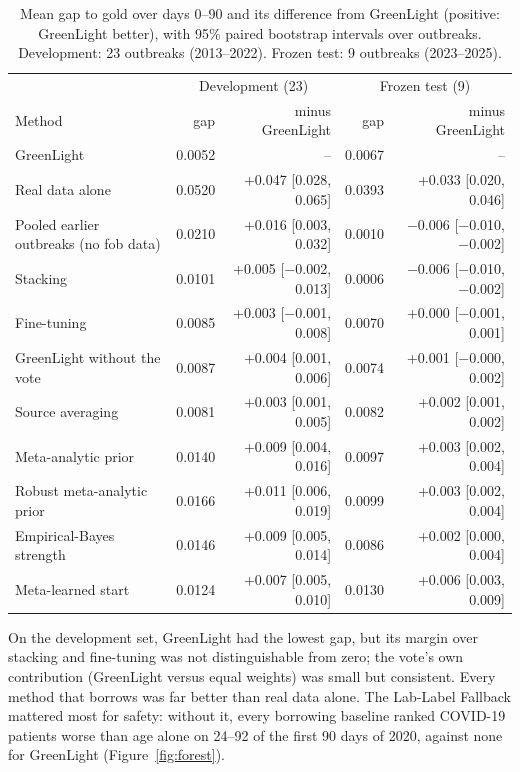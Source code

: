 \documentclass[10pt]{article}
\begin{document}
\begin{table}[t]
\centering\small
\caption{Mean gap to gold over days 0--90 and its difference from GreenLight (positive: GreenLight better), with 95\% paired
bootstrap intervals over outbreaks. Development: 23 outbreaks (2013--2022). Frozen test: 9 outbreaks (2023--2025).}
\label{tab:baselines}
\begin{tabular}{lrrrr}
\toprule
& \multicolumn{2}{c}{Development (23)} & \multicolumn{2}{c}{Frozen test (9)} \\
Method & gap & minus GreenLight & gap & minus GreenLight \\
\midrule
GreenLight & 0.0052 & -- & 0.0067 & -- \\
Real data alone & 0.0520 & +0.047 [0.028, 0.065] & 0.0393 & +0.033 [0.020, 0.046] \\
Pooled earlier outbreaks (no fob data) & 0.0210 & +0.016 [0.003, 0.032] & 0.0010 & $-$0.006 [$-$0.010, $-$0.002] \\
Stacking & 0.0101 & +0.005 [$-$0.002, 0.013] & 0.0006 & $-$0.006 [$-$0.010, $-$0.002] \\
Fine-tuning & 0.0085 & +0.003 [$-$0.001, 0.008] & 0.0070 & +0.000 [$-$0.001, 0.001] \\
GreenLight without the vote & 0.0087 & +0.004 [0.001, 0.006] & 0.0074 & +0.001 [$-$0.000, 0.002] \\
Source averaging & 0.0081 & +0.003 [0.001, 0.005] & 0.0082 & +0.002 [0.001, 0.002] \\
Meta-analytic prior & 0.0140 & +0.009 [0.004, 0.016] & 0.0097 & +0.003 [0.002, 0.004] \\
Robust meta-analytic prior & 0.0166 & +0.011 [0.006, 0.019] & 0.0099 & +0.003 [0.002, 0.004] \\
Empirical-Bayes strength & 0.0146 & +0.009 [0.005, 0.014] & 0.0086 & +0.002 [0.000, 0.004] \\
Meta-learned start & 0.0124 & +0.007 [0.005, 0.010] & 0.0130 & +0.006 [0.003, 0.009] \\
\bottomrule
\end{tabular}
\end{table}

On the development set, GreenLight had the lowest gap, but its margin over stacking and fine-tuning was not distinguishable
from zero; the vote's own contribution (GreenLight versus equal weights) was small but consistent. Every method that borrows
was far better than real data alone. The Lab-Label Fallback mattered most for safety: without it, every borrowing
baseline ranked COVID-19 patients worse than age alone on 24--92 of the first 90 days of 2020, against none for GreenLight
(Figure~\ref{fig:forest}).
\end{document}
